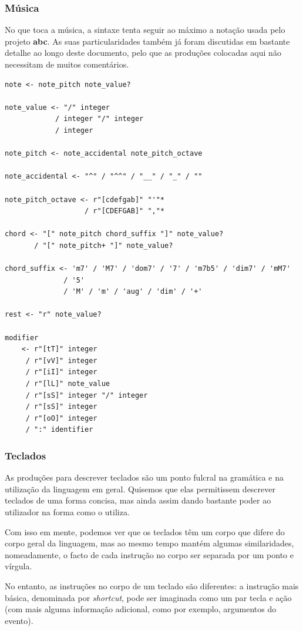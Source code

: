 \subsubsection{Música}
No que toca a música, a sintaxe tenta seguir ao máximo a notação usada pelo projeto \textbf{abc}. As suas particularidades também já foram discutidas em bastante detalhe ao longo deste documento, pelo que as produções colocadas aqui não necessitam de muitos comentários.
\begin{lstlisting}[caption={Produções de elementos musicais na gramática},language={}]
note <- note_pitch note_value?

note_value <- "/" integer
            / integer "/" integer
            / integer

note_pitch <- note_accidental note_pitch_octave

note_accidental <- "^" / "^^" / "__" / "_" / ""

note_pitch_octave <- r"[cdefgab]" "'"*
                   / r"[CDEFGAB]" ","*

chord <- "[" note_pitch chord_suffix "]" note_value?
       / "[" note_pitch+ "]" note_value?

chord_suffix <- 'm7' / 'M7' / 'dom7' / '7' / 'm7b5' / 'dim7' / 'mM7'
              / '5'
              / 'M' / 'm' / 'aug' / 'dim' / '+'

rest <- "r" note_value?

modifier
    <- r"[tT]" integer
     / r"[vV]" integer
     / r"[iI]" integer
     / r"[lL]" note_value
     / r"[sS]" integer "/" integer
     / r"[sS]" integer
     / r"[oO]" integer
     / ":" identifier
\end{lstlisting}

\subsubsection{Teclados}
As produções para descrever teclados são um ponto fulcral na gramática e na utilização da linguagem em geral. Quisemos que elas permitissem descrever teclados de uma forma concisa, mas ainda assim dando bastante poder ao utilizador na forma como o utiliza.

Com isso em mente, podemos ver que os teclados têm um corpo que difere do corpo geral da linguagem, mas ao mesmo tempo mantém algumas similaridades, nomeadamente, o facto de cada instrução no corpo ser separada por um ponto e vírgula.

No entanto, as instruções no corpo de um teclado são diferentes: a instrução mais básica, denominada por \textit{shortcut}, pode ser imaginada como um par tecla e ação (com mais alguma informação adicional, como por exemplo, argumentos do evento).


